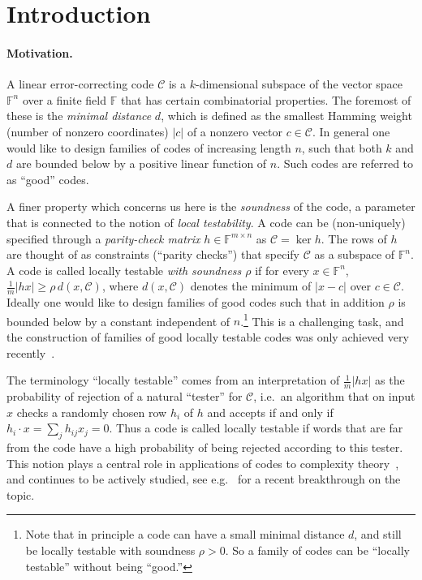 \documentclass[11pt]{article}
\theoremstyle{definition}
\newcommand{\code}{\mathscr{C}}
\newcommand{\F}{\ensuremath{\mathbb{F}}}
\begin{document}
\section{Introduction}

\paragraph{Motivation.}
A linear error-correcting code $\code$ is a $k$-dimensional subspace of the vector space $\F^n$ over a finite field $\F$ that has certain combinatorial properties. The foremost of these is the \emph{minimal distance} $d$, which is defined as the smallest Hamming weight (number of nonzero coordinates) $|c|$ of a nonzero vector  $c\in\code$. In general one would like to design families of codes of increasing length $n$, such that both $k$ and $d$ are bounded below by a positive linear function of $n$. Such codes are referred to as ``good'' codes.

A finer property which concerns us here is the \emph{soundness} of the code, a parameter that is connected to the notion of \emph{local testability}. A code can be (non-uniquely) specified through a \emph{parity-check matrix} $h\in\F^{m\times n}$ as $\code = \ker h$. The rows of $h$ are thought of as constraints (``parity checks'') that specify $\code$ as a subspace of $\F^n$. A code is called locally testable \emph{with soundness $\rho$} if for every $x\in \F^n$, $\frac{1}{m}|hx|\geq \rho\, d(x,\code)$, where $d(x,\code)$ denotes the minimum of $|x-c|$ over $c\in \code$.  Ideally one would like to design families of good codes such that in addition $\rho$ is bounded below by a constant independent of $n$.\footnote{Note that in principle a code can have a small minimal distance $d$, and still be locally testable with soundness $\rho>0$. So a family of codes can be ``locally testable'' without being ``good.''  } This is a challenging task, and the construction of families of good locally testable codes was only achieved very recently~\cite{LTC_DELLM}. 

The terminology ``locally testable'' comes from an interpretation of $\frac{1}{m}|hx|$ as the probability of rejection of a natural ``tester'' for $\code$, i.e.\ an algorithm that on input $x$ checks a randomly chosen row $h_i$ of $h$ and accepts if and only if $h_i\cdot x = \sum_j h_{ij} x_j =0$.  Thus a code is called locally testable if words that are far from the code have a high probability of being rejected according to this tester. This notion plays a central role in applications of codes to complexity theory~\cite{babai1991non,PCP_thm}, and continues to be actively studied, see e.g.~\cite{LTC_DELLM,LTC_Panteleev_Kalachev} for a recent breakthrough on the topic. 
\end{document}
